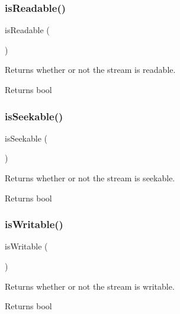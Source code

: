\subsubsection{\texorpdfstring{is\+Readable()}{isReadable()}}
{\footnotesize\ttfamily is\+Readable (\begin{DoxyParamCaption}{ }\end{DoxyParamCaption})}

Returns whether or not the stream is readable.

\begin{DoxyReturn}{Returns}
bool 
\end{DoxyReturn}
\mbox{\label{class_pes_1_1_http_1_1_stream_a1fba032525b1840361a44bc001252693}} 
\subsubsection{\texorpdfstring{is\+Seekable()}{isSeekable()}}
{\footnotesize\ttfamily is\+Seekable (\begin{DoxyParamCaption}{ }\end{DoxyParamCaption})}

Returns whether or not the stream is seekable.

\begin{DoxyReturn}{Returns}
bool 
\end{DoxyReturn}
\mbox{\label{class_pes_1_1_http_1_1_stream_a63ce3bd392eed625d7e91db404b6fa3c}} 
\subsubsection{\texorpdfstring{is\+Writable()}{isWritable()}}
{\footnotesize\ttfamily is\+Writable (\begin{DoxyParamCaption}{ }\end{DoxyParamCaption})}

Returns whether or not the stream is writable.

\begin{DoxyReturn}{Returns}
bool 
\end{DoxyReturn}
\mbox{\label{class_pes_1_1_http_1_1_stream_a2acacba716a933935d63b2bacf52cff6}} 
